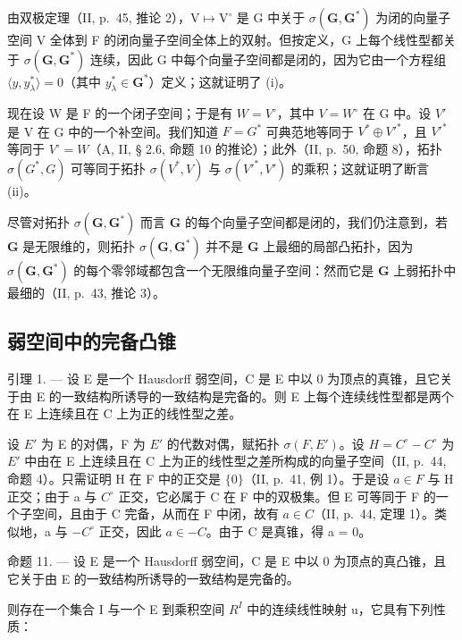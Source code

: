 由双极定理（II, p.~45, 推论 2），\(\mathrm{V} \mapsto \mathrm{V}^{\circ}\) 是 G 中关于 \(\sigma(\mathbf{G}, \mathbf{G}^{*})\) 为闭的向量子空间 V 全体到 F 的闭向量子空间全体上的双射。但按定义，G 上每个线性型都关于 \(\sigma(\mathbf{G}, \mathbf{G}^{*})\) 连续，因此 G 中每个向量子空间都是闭的，因为它由一个方程组 \(\langle y, y_{\lambda}^{*} \rangle = 0\)（其中 \(y_{\lambda}^{*} \in \mathbf{G}^{*}\)）定义；这就证明了 (i)。

现在设 W 是 F 的一个闭子空间；于是有 \(W = V^{\circ}\)，其中 \(V = W^{\circ}\) 在 G 中。设 \(V'\) 是 V 在 G 中的一个补空间。我们知道 \(F = G^{*}\) 可典范地等同于 \(V^{*} \oplus V'^{*}\)，且 \(V'^{*}\) 等同于 \(V^{\circ} = W\)（A, II, § 2.6, 命题 10 的推论）；此外（II, p.~50, 命题 8），拓扑 \(\sigma(G^{*}, G)\) 可等同于拓扑 \(\sigma(V^{*}, V)\) 与 \(\sigma(V'^{*}, V')\) 的乘积；这就证明了断言 (ii)。

尽管对拓扑 \(\sigma(\mathbf{G},\mathbf{G}^{*})\) 而言 \(\mathbf{G}\) 的每个向量子空间都是闭的，我们仍注意到，若 \(\mathbf{G}\) 是无限维的，则拓扑 \(\sigma(\mathbf{G},\mathbf{G}^{*})\) 并不是 \(\mathbf{G}\) 上最细的局部凸拓扑，因为 \(\sigma(\mathbf{G},\mathbf{G}^{*})\) 的每个零邻域都包含一个无限维向量子空间：然而它是 \(\mathbf{G}\) 上弱拓扑中最细的（II, p.~43, 推论 3）。

\subsection{弱空间中的完备凸锥}

引理 1. --- 设 E 是一个 Hausdorff 弱空间，C 是 E 中以 0 为顶点的真锥，且它关于由 E 的一致结构所诱导的一致结构是完备的。则 E 上每个连续线性型都是两个在 E 上连续且在 C 上为正的线性型之差。

设 \(E'\) 为 E 的对偶，F 为 \(E'\) 的代数对偶，赋拓扑 \(\sigma(F, E')\)。设 \(H = C^{\circ} - C^{\circ}\) 为 \(E'\) 中由在 E 上连续且在 C 上为正的线性型之差所构成的向量子空间（II, p.~44, 命题 4）。只需证明 H 在 F 中的正交是 \(\{0\}\)（II, p.~41, 例 1）。于是设 \(a \in F\) 与 H 正交；由于 a 与 \(C^{\circ}\) 正交，它必属于 C 在 F 中的双极集。但 E 可等同于 F 的一个子空间，且由于 C 完备，从而在 F 中闭，故有 \(a \in C\)（II, p.~44, 定理 1）。类似地，a 与 \(-C^{\circ}\) 正交，因此 \(a \in -C\)。由于 C 是真锥，得 a = 0。

命题 11. --- 设 E 是一个 Hausdorff 弱空间，C 是 E 中以 0 为顶点的真凸锥，且它关于由 E 的一致结构所诱导的一致结构是完备的。

则存在一个集合 I 与一个 E 到乘积空间 \(R^{I}\) 中的连续线性映射 u，它具有下列性质：

